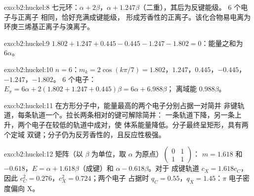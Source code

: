 \begin{solution}{exo:b2:huckel:8}
七元环：$\alpha + 2\beta$，$\alpha + 1.247\beta$（二重），其后为反键能级。
6 个电子与正离子  相同，恰好充满成键能级，
形成芳香性的正离子。该化合物易电离为环庚三烯基正离子与溴离子。
\end{solution}

\begin{solution}{exo:b2:huckel:9}
$1.802 + 1.247 + 0.445 - 0.445 - 1.247 - 1.802 = 0$：能量之和为 $6\alpha$。
\end{solution}

\begin{solution}{exo:b2:huckel:10}
$n = 6$：$m_k = 2\cos(k\pi/7) = 1.802$，$1.247$，$0.445$，$-0.445$，$-1.247$，$-1.802$。
6 个电子：$E_\pi = 6\alpha + 2(1.802 + 1.247 + 0.445)\beta = 6\alpha + 6.988\beta$；
离域能 $0.988\beta$。
\end{solution}

\begin{solution}{exo:b2:huckel:11}
在方形分子中，能量最高的两个电子分别占据一对简并
非键轨道，每条轨道一个。拉长两条相对的键可解除简并：
一条轨道下降，另一条上升，两个电子在较低的轨道中成对，使
体系能量降低。分子最终呈矩形，具有两个定域
双键；分子仍为反芳香性的，且反应性极强。
\end{solution}

\begin{solution}{exo:b2:huckel:12}
矩阵（以 $\beta$ 为单位，取 $\alpha$ 为原点）$\begin{pmatrix}0 & 1\\ 1 & 1\end{pmatrix}$：
$m = 1.618$ 和 $-0.618$，$E = \alpha + 1.618\beta$（成键）和 $\alpha - 0.618\beta$。对于
成键轨道 $c_X = 1.618c_C$，因此 $c_C^2 = 0.276$，$c_X^2 = 0.724$；两个电子
占据时 $q_C = 0.55$，$q_X = 1.45$：$\pi$ 电子密度偏向 X。
\end{solution}

